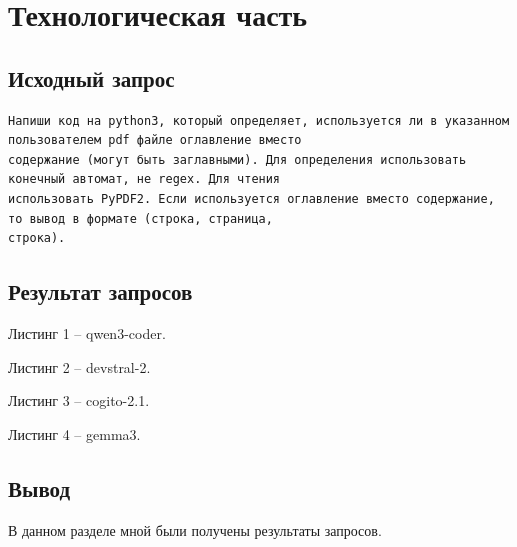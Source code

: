 \chapter{Технологическая часть}

\section{Исходный запрос}

\begin{Verbatim}[frame=single, commandchars=\\\{\}, fontsize=\scriptsize]
Напиши код на python3, который определяет, используется ли в указанном пользователем pdf файле оглавление вместо 
содержание (могут быть заглавными). Для определения использовать конечный автомат, не regex. Для чтения 
использовать PyPDF2. Если используется оглавление вместо содержание, то вывод в формате (строка, страница, 
строка).
\end{Verbatim}

\section{Результат запросов}

%
Листинг 1 -- qwen3-coder.

%
Листинг 2 -- devstral-2.

%
Листинг 3 -- cogito-2.1.

%
Листинг 4 -- gemma3.

\section*{Вывод}

В данном разделе мной были получены результаты запросов.

\clearpage
